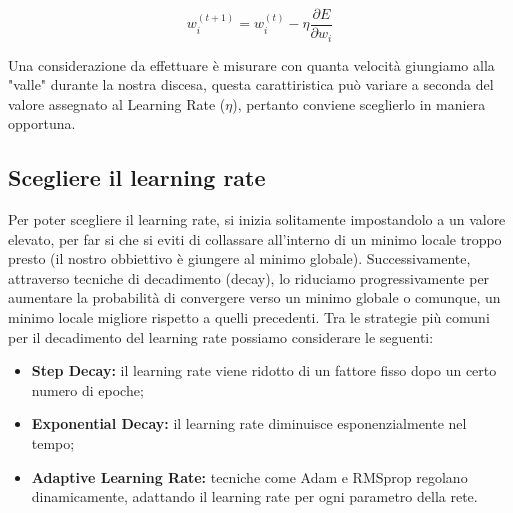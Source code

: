 \begin{equation}
    w_i^{(t+1)} =w_i^{(t)}-\eta\frac{\partial E}{\partial w_i}
\end{equation}

Una considerazione da effettuare è misurare con quanta velocità giungiamo alla "valle" durante la nostra discesa, questa carattiristica può variare a seconda del valore assegnato al Learning Rate ($\eta$), pertanto conviene sceglierlo in maniera opportuna.

\subsection{Scegliere il learning rate}
Per poter scegliere il learning rate, si inizia solitamente impostandolo a un valore elevato, per far si che si eviti di collassare all'interno di un minimo locale troppo presto (il nostro obbiettivo è giungere al minimo globale). Successivamente, attraverso tecniche di decadimento (decay), lo riduciamo progressivamente per aumentare la probabilità di convergere verso un minimo globale o comunque, un minimo locale migliore rispetto a quelli precedenti. Tra le strategie più comuni per il decadimento del learning rate possiamo considerare le seguenti:
\begin{itemize}
\item\textbf{Step Decay:} il learning rate viene ridotto di un fattore fisso dopo un certo numero di epoche;
\item\textbf{Exponential Decay:} il learning rate diminuisce esponenzialmente nel tempo;
\item\textbf{Adaptive Learning Rate:} tecniche come Adam e RMSprop regolano dinamicamente, adattando il learning rate per ogni parametro della rete.
\end{itemize}

